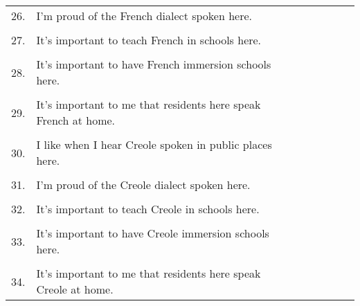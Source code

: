 \begin{longtable}[c]{| r p{} | c | c | c | c | c |}
          &                                                                           & & & & & \\
      \hline
      26. & I'm proud of the French dialect spoken here.                              & & & & & \\
          &                                                                           & & & & & \\
      \hline
      27. & It's important to teach French in schools here.                           & & & & & \\
          &                                                                           & & & & & \\
      \hline
      28. & It's important to have French immersion schools here.                     & & & & & \\
          &                                                                           & & & & & \\
      \hline
      29. & It's important to me that residents here speak French at home.            & & & & & \\
          &                                                                           & & & & & \\
      \hline
      30. & I like when I hear Creole spoken in public places here.                   & & & & & \\
          &                                                                           & & & & & \\
      \hline
      31. & I'm proud of the Creole dialect spoken here.                              & & & & & \\
          &                                                                           & & & & & \\
      \hline
      32. & It's important to teach Creole in schools here.                           & & & & & \\
          &                                                                           & & & & & \\
      \hline
      33. & It's important to have Creole immersion schools here.                     & & & & & \\
          &                                                                           & & & & & \\
      \hline
      34. & It's important to me that residents here speak Creole at home.         & & & & & \\

\end{longtable}
